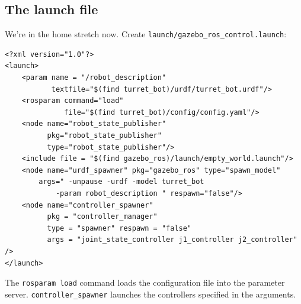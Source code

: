 \documentclass{article}
\begin{document}
        \subsection{The launch file}
            We're in the home stretch now. Create \texttt{launch/gazebo\_ros\_control.launch}:
            \begin{verbatim}
<?xml version="1.0"?>
<launch>
    <param name = "/robot_description" 
           textfile="$(find turret_bot)/urdf/turret_bot.urdf"/>
    <rosparam command="load" 
              file="$(find turret_bot)/config/config.yaml"/>
    <node name="robot_state_publisher" 
          pkg="robot_state_publisher" 
          type="robot_state_publisher"/>
    <include file = "$(find gazebo_ros)/launch/empty_world.launch"/>
    <node name="urdf_spawner" pkg="gazebo_ros" type="spawn_model"
        args=" -unpause -urdf -model turret_bot 
            -param robot_description " respawn="false"/>
    <node name="controller_spawner" 
          pkg = "controller_manager" 
          type = "spawner" respawn = "false"
          args = "joint_state_controller j1_controller j2_controller" />
</launch>
            \end{verbatim}
            The \texttt{rosparam load} command loads the configuration file into the 
            parameter server. \texttt{controller\_spawner} launches the controllers specified
            in the arguments.
\end{document}
